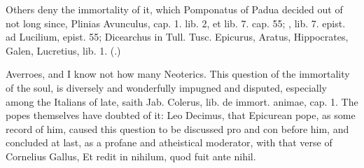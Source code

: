 {Others deny the immortality of it, which Pomponatus of Padua decided
out of \Aristotle not long since, Plinias Avunculus, cap. 1. lib. 2, et
lib. 7. cap. 55; \Seneca, lib. 7. epist. ad Lucilium, epist. 55;
Dicearchus in Tull. Tusc. Epicurus, Aratus, Hippocrates, Galen,
Lucretius, lib. 1.
(.)

Averroes, and I know not how many Neoterics. This question of the
immortality of the soul, is diversely and wonderfully impugned and
disputed, especially among the Italians of late, saith Jab. Colerus,
lib. de immort. animae, cap. 1. The popes themselves have doubted of
it: Leo Decimus, that Epicurean pope, as some record of him,
caused this question to be discussed pro and con before him, and
concluded at last, as a profane and atheistical moderator, with that
verse of Cornelius Gallus, Et redit in nihilum, quod fuit ante nihil.

}
